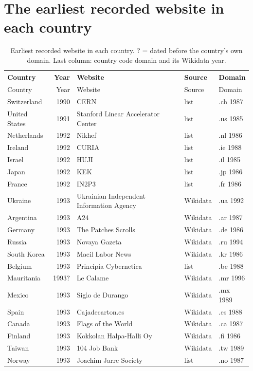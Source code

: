 \documentclass[11pt,a4paper]{article}
\begin{document}
\section{The earliest recorded website in each country}
\begin{small}\begin{longtable}{lrp{6.2cm}ll}\caption{Earliest recorded website in each country. ? = dated before the country's own domain. Last column: country code domain and its Wikidata year.}\label{tab:firsts}\\\toprule Country & Year & Website & Source & Domain\\\midrule\endfirsthead\toprule Country & Year & Website & Source & Domain\\\midrule\endhead
Switzerland & 1990 & CERN & list & .ch 1987\\
United States & 1991 & Stanford Linear Accelerator Center & list & .us 1985\\
Netherlands & 1992 & Nikhef & list & .nl 1986\\
Ireland & 1992 & CURIA & list & .ie 1988\\
Israel & 1992 & HUJI & list & .il 1985\\
Japan & 1992 & KEK & list & .jp 1986\\
France & 1992 & IN2P3 & list & .fr 1986\\
Ukraine & 1993 & Ukrainian Independent Information Agency & Wikidata & .ua 1992\\
Argentina & 1993 & A24 & Wikidata & .ar 1987\\
Germany & 1993 & The Patches Scrolls & Wikidata & .de 1986\\
Russia & 1993 & Novaya Gazeta & Wikidata & .ru 1994\\
South Korea & 1993 & Maeil Labor News & Wikidata & .kr 1986\\
Belgium & 1993 & Principia Cybernetica & list & .be 1988\\
Mauritania & 1993? & Le Calame & Wikidata & .mr 1996\\
Mexico & 1993 & Siglo de Durango & Wikidata & .mx 1989\\
Spain & 1993 & Cajadecarton.es & Wikidata & .es 1988\\
Canada & 1993 & Flags of the World & Wikidata & .ca 1987\\
Finland & 1993 & Kokkolan Halpa-Halli Oy & Wikidata & .fi 1986\\
Taiwan & 1993 & 104 Job Bank & Wikidata & .tw 1989\\
Norway & 1993 & Joachim Jarre Society & list & .no 1987\\

\end{longtable}
\end{small}
\end{document}
